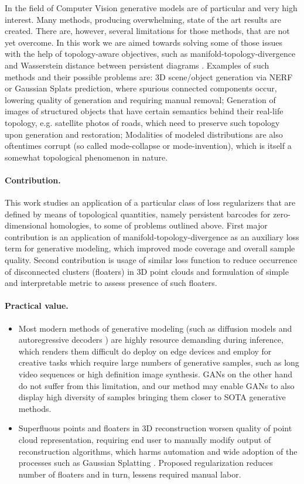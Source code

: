 In the field of Computer Vision generative models are of particular and very high interest. Many methods, producing overwhelming, state of the art results are created. There are, however, several limitations for those methods, that are not yet overcome. In this work we are aimed towards solving some of those issues with the help of topology-aware objectives, such as manifold-topology-divergence \cite{MTopDiv} and Wasserstein distance between persistent diagrams \cite{topo-segm}. Examples of such methods and their possible problems are: 3D scene/object generation via NERF or Gaussian Splats prediction, where spurious connected components occur, lowering quality of generation and requiring manual removal; Generation of images of structured objects that have certain semantics behind their real-life topology, e.g. satellite photos of roads, which need to preserve such topology upon generation and restoration; Modalities of modeled distributions are also oftentimes corrupt (so called mode-collapse or mode-invention), which is itself a somewhat topological phenomenon in nature.

\paragraph{Contribution.}
This work studies an application of a particular class of loss regularizers that are defined by means of topological quantities, namely persistent barcodes for zero-dimensional homologies, to some of problems outlined above. First major contribution is an application of manifold-topology-divergence \cite{MTopDiv} as an auxiliary loss term for generative modeling, which improved mode coverage and overall sample quality. Second contribution is usage of similar loss function to reduce occurrence of disconnected clusters (floaters) in 3D point clouds and formulation of simple and interpretable metric to assess presence of such floaters.

\paragraph{Practical value.}
    \begin{itemize}
        \item Most modern methods of generative modeling (such as diffusion models \cite{ho2020denoising} and autoregressive decoders \cite{tian2024visual}) are highly resource demanding during inference, which renders them difficult do deploy on edge devices and employ for creative tasks which require large numbers of generative samples, such as long video sequences or high definition image synthesis. GANs on the other hand do not suffer from this limitation, and our method may enable GANs to also display high diversity of samples bringing them closer to SOTA generative methods.
        \item Superfluous points and floaters in 3D reconstruction worsen quality of point cloud representation, requiring end user to manually modify output of reconstruction algorithms, which harms automation and wide adoption of the processes such as Gaussian Splatting \cite{kerbl20233d}. Proposed regularization reduces number of floaters and in turn, lessens required manual labor.
    \end{itemize}
